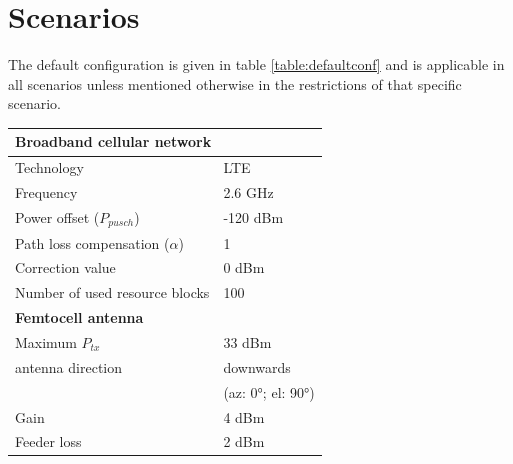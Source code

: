 \documentclass[twocolumn]{phdsymp} %
\begin{document}
\FloatBarrier
\section{Scenarios}
The default configuration is given in table \ref{table:defaultconf} and is
applicable in all scenarios unless mentioned otherwise in the restrictions of that specific scenario. 

\begin{table}[!htb]
\centering
\begin{tabular}[t]{ll}
        \toprule
        \multicolumn{2}{l}{\textbf{Broadband cellular network}} \\
        \hline
        \hspace{3mm}  Technology                          & LTE     \\
        \hspace{3mm}  Frequency                           & 2.6 GHz \\
        \hspace{3mm}  Power offset ($P_{pusch}$)            & -120 dBm  \\
        \hspace{3mm}  Path loss compensation ($\alpha$)   & 1  \\
        \hspace{3mm}  Correction value                    & 0 dBm  \\
        \hspace{3mm}  Number of used resource blocks      & 100  \\
        \hline
        \multicolumn{2}{l}{\textbf{Femtocell antenna}} \\
        \hline  
        \hspace{3mm}  Maximum $P_{tx}$                    & 33 dBm   \\
        \hspace{3mm}  antenna  direction                  & downwards   \\ 
        \hspace{3mm}                                      & (az: \ang{0}; el: \ang{90})    \\
        \hspace{3mm}  Gain                                & 4 dBm   \\ 
        \hspace{3mm}  Feeder loss                         & 2 dBm   \\ 

\end{tabular}
\end{table}
\end{document}
